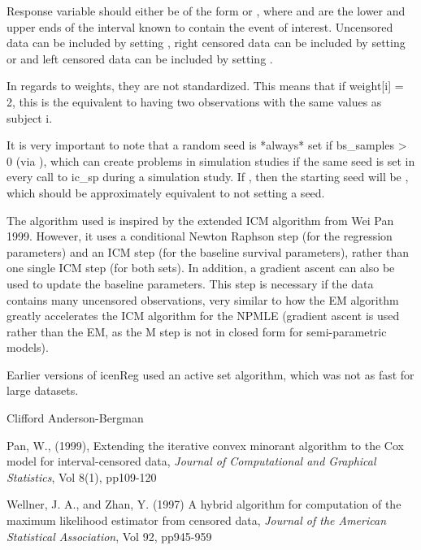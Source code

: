 \documentclass[a4paper]{book}
\begin{document}
\begin{Details}\relax

Response variable should either be of the form  or , where  and  are the lower and upper ends of the interval known to contain the event of interest. Uncensored data can be included by setting , right censored data can be included by setting  or  and left censored data can be included by setting .

In regards to weights, they are not standardized. This means that if weight[i] = 2, this is the equivalent to having two observations with the same values as subject i. 

It is very important to note that a random seed is *always* set if bs\_samples > 0 (via ), which can create problems in simulation studies if the same seed is set in every call to ic\_sp during a simulation study. If , then the starting seed will be , which should be approximately equivalent to not setting a seed. 

The algorithm used is inspired by the extended ICM algorithm from Wei Pan 1999. However, it uses a conditional Newton Raphson step (for the regression parameters) and an ICM step (for the baseline survival parameters), rather than one single ICM step (for both sets). In addition, a gradient ascent can also be used to update the baseline parameters. This step is necessary if the data contains many uncensored observations, very similar to how the EM algorithm greatly accelerates the ICM algorithm for the NPMLE (gradient ascent is used rather than the EM, as the M step is not in closed form for semi-parametric models). 

Earlier versions of icenReg used an active set algorithm, which was not as fast for large datasets. 
\end{Details}
%
\begin{Author}\relax
Clifford Anderson-Bergman
\end{Author}
%
\begin{References}\relax
Pan, W., (1999), Extending the iterative convex minorant algorithm to the Cox model for interval-censored data, \emph{Journal of Computational and Graphical Statistics}, Vol 8(1), pp109-120

Wellner, J. A., and Zhan, Y. (1997) A hybrid algorithm for computation of the maximum likelihood estimator from censored data, \emph{Journal of the  American Statistical Association}, Vol 92, pp945-959
\end{References}
\end{document}
